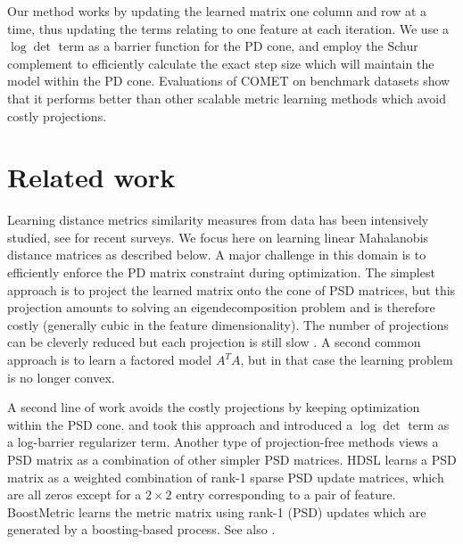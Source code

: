 \documentclass[twoside,11pt]{article}
\newcommand{\ignore}[1]{}
\begin{document}
Our method works by updating the learned matrix one column and row at a time, thus updating the terms relating to one feature at each iteration. We use a $\log \det$ term as a barrier function for the PD cone, and employ the Schur complement to efficiently calculate the exact step size which will maintain the model within the PD cone. Evaluations of COMET on benchmark datasets show that it performs better than other scalable metric learning methods which avoid costly projections. 

\ignore{Furthermore an important challenge for metric learning is the case where the set of features is not fixed in advance, but changes with time. This is a typical scenario in many real life applications of learning: as more data accumulates, it is possible to estimate more parameters accurately, so more features and signals are gradually added to existing systems. It is therefore desirable to develop algorithms that can learn metrics in face of a growing feature set. Our method naturally adapts to this setting, by optimizing the metric matrix one column-row at a time.}

\section{Related work}
Learning distance metrics similarity measures from data has been intensively studied, see \citet{bellet2013survey, kulis2012survey} for recent surveys. We focus here on learning linear Mahalanobis distance matrices as described below. A major challenge in this domain is to efficiently enforce the PD matrix constraint during optimization. The simplest approach is to project the learned matrix onto the cone of PSD matrices, but this projection amounts to solving an eigendecomposition problem and is therefore costly (generally cubic in the feature dimensionality). The number of projections can be cleverly reduced but each projection is still slow \citep{qianHD, qian}. A second common approach is to learn a factored model $A^TA$, but in that case the learning problem is no longer convex. 

A second line of work avoids the costly projections by keeping optimization within the PSD cone. \citet{davis2007information} and \citet{lego} took this approach and introduced a $\log \det$ term as a log-barrier regularizer term. Another type of projection-free methods views a PSD matrix as a combination of other simpler PSD matrices. HDSL \citep{hdsl} learns a PSD matrix as a weighted combination of rank-1 sparse PSD update matrices, which are all zeros except for a $2\times2$ entry corresponding to a pair of feature. BoostMetric \citep{boost} learns the metric matrix using rank-1 (PSD) updates which are generated by a boosting-based process. See also \citet{bi2011adaboost, liu2012robust}.
\end{document}
